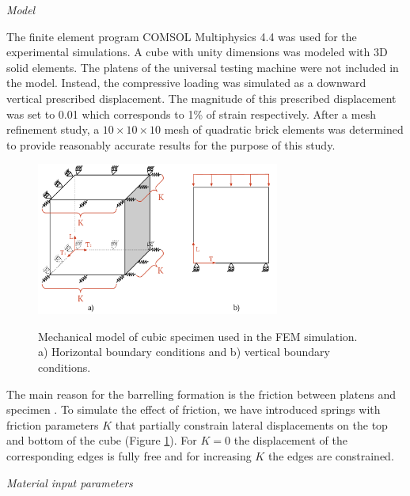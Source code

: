 \documentclass[review]{elsarticle}
\begin{document}
\begin{description}
\item{\textit{Model}}
\end{description}





The finite element program COMSOL Multiphysics 4.4 \cite{Comsol} was used for
the experimental simulations.
A cube with unity dimensions was modeled with
3D solid elements.
The platens of the universal testing machine were not included in the model.
Instead, the compressive loading was simulated as a downward vertical prescribed
displacement. The magnitude of this prescribed displacement was set to 0.01
which corresponds to  1\%  of  strain respectively.
After a mesh refinement study, a $10\times10\times10$ mesh of quadratic brick
elements was determined to provide reasonably accurate results for the purpose of this study.

\begin{figure}[h]
\centering
\includegraphics[width=8cm]{BarellingPaper.pdf}
\label{fig:Barrelling}
\caption{\label{fig:Barrelling} Mechanical model of cubic
specimen used in the FEM simulation. ​
a) Horizontal boundary conditions and b) vertical boundary conditions.}
\end{figure}

The main reason for the barrelling formation is the friction between platens
and specimen \cite{Narayanasamy198821, kulkarni1969}. To simulate the effect of friction, 
we have introduced springs with friction parameters $K$ that partially constrain
lateral displacements on the top and bottom of the cube (Figure
\ref{fig:Barrelling}).
For $K=0$ the displacement of the corresponding edges is fully free
and for increasing $K$ the edges are constrained.

\begin{description}
\item{\textit{Material input parameters}}
\end{description}
\end{document}
